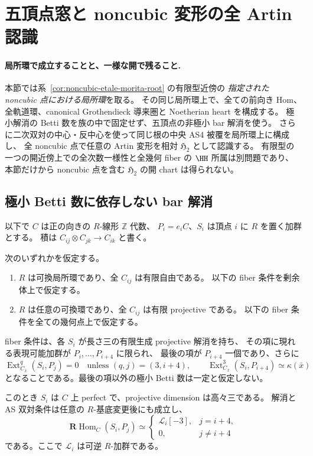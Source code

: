 \section{五頂点窓と noncubic 変形の全 Artin 認識}
\label{sec:noncubic-local-tails}

\paragraph{局所環で成立することと、一様な開で残ること.}
本節では系~\ref{cor:noncubic-etale-morita-root} の有限型近傍の
\emph{指定された noncubic 点における局所環}を取る。
その同じ局所環上で、全ての前向き Hom、全軌道環、canonical
Grothendieck 導来圏と Noetherian heart を構成する。
極小解消の Betti 数を族の中で固定せず、五頂点の非極小 bar 解消を使う。
さらに二次双対の中心・反中心を使って同じ根の中央 AS4 被覆を局所環上に構成し、
全 noncubic 点で任意の Artin 変形を相対 $\mathfrak H_2$ として認識する。
有限型の一つの開近傍上での全次数一様性と全幾何 fiber の $\HH$ 所属は別問題であり、
本節だけから noncubic 点を含む $\mathfrak H_2$ の開 chart は得られない。

\subsection{極小 Betti 数に依存しない bar 解消}

以下で $C$ は正の向きの $R$-線形 $\mathbb Z$ 代数、
$P_i=e_iC$、$S_i$ は頂点 $i$ に $R$ を置く加群とする。
積は $C_{ij}\otimes C_{jk}\to C_{ik}$ と書く。

\begin{lemma}
\label{lem:five-window-bar-lifting}
次のいずれかを仮定する。
\begin{enumerate}
\item $R$ は可換局所環であり、全 $C_{ij}$ は有限自由である。
  以下の fiber 条件を剰余体上で仮定する。
\item $R$ は任意の可換環であり、全 $C_{ij}$ は有限 projective である。
  以下の fiber 条件を全ての幾何点上で仮定する。
\end{enumerate}
fiber 条件は、各 $S_i$ が長さ三の有限生成 projective 解消を持ち、
その項に現れる表現可能加群が $P_i,\ldots,P_{i+4}$ に限られ、
最後の項が $P_{i+4}$ 一個であり、さらに
\[
 \operatorname{Ext}_{C_{\bar x}}^q(S_i,P_j)=0
 \quad\text{unless }(q,j)=(3,i+4),\qquad
 \operatorname{Ext}_{C_{\bar x}}^3(S_i,P_{i+4})\simeq\kappa(\bar x)
 \tag{BW-fiber}\label{eq:five-window-fiber-dual}
\]
となることである。最後の項以外の極小 Betti 数は一定と仮定しない。

このとき $S_i$ は $C$ 上 perfect で、projective dimension は高々三である。
解消と AS 双対条件は任意の $R$-基底変更後にも成立し、
\[
 \mathbf R\operatorname{Hom}_{C}(S_i,P_j)\simeq
 \begin{cases}\mathcal L_i[-3],&j=i+4,\\0,&j\ne i+4\end{cases}
 \tag{BW-dual}\label{eq:five-window-relative-dual}
\]
である。ここで $\mathcal L_i$ は可逆 $R$-加群である。
\end{lemma}

